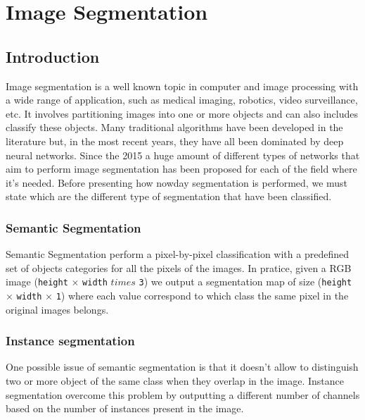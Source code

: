 
\chapter{Image Segmentation}

\label{chp:segmentation}

\def\:{\hskip0pt} %

\section{Introduction}
Image segmentation is a well known topic in computer and image processing with a
wide range of application, such as medical imaging, robotics, video
surveillance, etc.
It involves partitioning images into one or more objects and can also includes
classify these objects. Many traditional algorithms have been developed in the
literature but, in the most recent years, they have all been dominated by deep
neural networks. Since the 2015 a huge amount of different types of networks
that aim to perform image segmentation has been proposed for each of the field
where it's needed.
Before presenting how nowday segmentation is performed, we must state which are
the different type of segmentation that have been classified.

\subsection{Semantic Segmentation}
Semantic Segmentation perform a pixel-by-pixel classification with a predefined
set of objects categories for all the pixels of the images. In pratice, given a
RGB image (\texttt{height} $\times$ \texttt{width} $times$ \texttt{3}) we output
a segmentation map of size (\texttt{height} $\times$ \texttt{width} $\times$
\texttt{1}) where each value correspond to which class the same pixel in the
original images belongs.

\subsection{Instance segmentation}
One possible issue of semantic segmentation is that it doesn't allow to
distinguish two or more object of the same class when they overlap in the image.
Instance segmentation overcome this problem by outputting a different number of
channels based on the number of instances present in the image.

